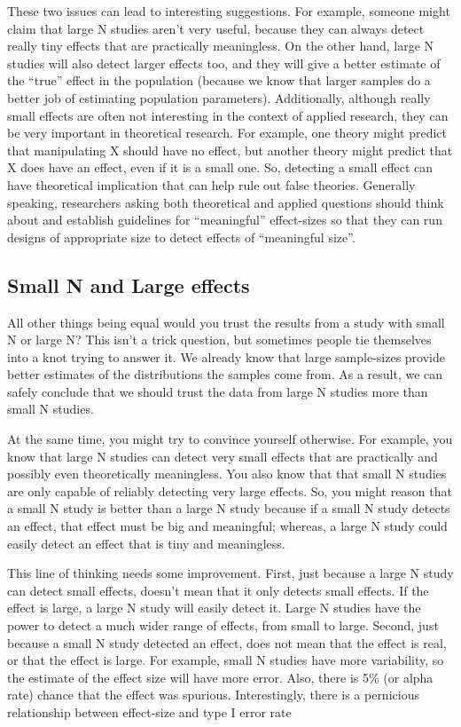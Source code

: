 \documentclass[
]{book}
\begin{document}
These two issues can lead to interesting suggestions. For example, someone might claim that large N studies aren't very useful, because they can always detect really tiny effects that are practically meaningless. On the other hand, large N studies will also detect larger effects too, and they will give a better estimate of the ``true'' effect in the population (because we know that larger samples do a better job of estimating population parameters). Additionally, although really small effects are often not interesting in the context of applied research, they can be very important in theoretical research. For example, one theory might predict that manipulating X should have no effect, but another theory might predict that X does have an effect, even if it is a small one. So, detecting a small effect can have theoretical implication that can help rule out false theories. Generally speaking, researchers asking both theoretical and applied questions should think about and establish guidelines for ``meaningful'' effect-sizes so that they can run designs of appropriate size to detect effects of ``meaningful size''.

\subsection{Small N and Large effects}\label{small-n-and-large-effects}

All other things being equal would you trust the results from a study with small N or large N? This isn't a trick question, but sometimes people tie themselves into a knot trying to answer it. We already know that large sample-sizes provide better estimates of the distributions the samples come from. As a result, we can safely conclude that we should trust the data from large N studies more than small N studies.

At the same time, you might try to convince yourself otherwise. For example, you know that large N studies can detect very small effects that are practically and possibly even theoretically meaningless. You also know that that small N studies are only capable of reliably detecting very large effects. So, you might reason that a small N study is better than a large N study because if a small N study detects an effect, that effect must be big and meaningful; whereas, a large N study could easily detect an effect that is tiny and meaningless.

This line of thinking needs some improvement. First, just because a large N study can detect small effects, doesn't mean that it only detects small effects. If the effect is large, a large N study will easily detect it. Large N studies have the power to detect a much wider range of effects, from small to large. Second, just because a small N study detected an effect, does not mean that the effect is real, or that the effect is large. For example, small N studies have more variability, so the estimate of the effect size will have more error. Also, there is 5\% (or alpha rate) chance that the effect was spurious. Interestingly, there is a pernicious relationship between effect-size and type I error rate
\end{document}

